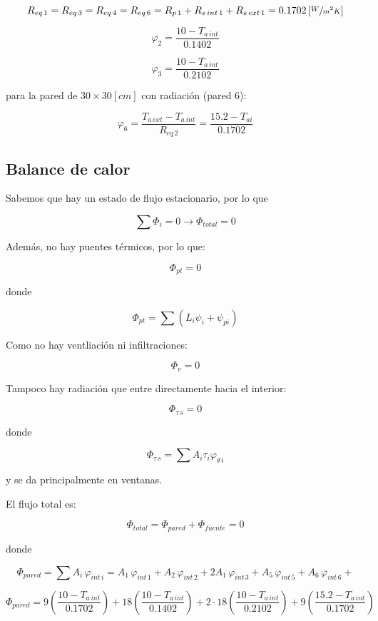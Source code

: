 \documentclass[12pt]{article}
\begin{document}
\[ R_{ eq \, 1 } = R_{ eq \, 3 } = R_{ eq \, 4 } = R_{ eq \, 6 } = R_{ p \, 1 } + R_{ s \, int \, 1 } + R_{ s \, ext \, 1 } = 0.1702 \left[ \sfrac{ W }{ m ^2 K } \right] \]

\[ \varphi _2 = \frac{ 10 - T_{ a \, int } }{ 0.1402 } \]

\[ \varphi _3 = \frac{ 10 - T_{ a \, int } }{ 0.2102 } \]

para la pared de $ 30 \times 30 \left[ cm \right] $ con radiación (pared 6):

\[ \varphi _6 = \frac{ T_{ a \, ext } - T_{ a \, int } }{ R_{ eq \, 2 } } = \frac{ 15.2 - T_{ ai } }{ 0.1702 } \]

\subsection{Balance de calor}

Sabemos que hay un estado de flujo estacionario, por lo que

\[  \sum{ \Phi _i } = 0 \longrightarrow \Phi _{ total } = 0 \]

Además, no hay puentes térmicos, por lo que:

\[ \Phi _{ pt } = 0 \]

donde

\[ \Phi _{ pt } = \sum{ \left( L_i \psi _i + \psi _{ pi } \right) }  \]

Como no hay ventliación ni infiltraciones:

\[ \Phi _v = 0 \]

Tampoco hay radiación que entre directamente hacia el interior:

\[ \Phi _{ \tau \, s } = 0 \]

donde

\[ \Phi _{ \tau \, s } = \sum{ A_i \tau _i \varphi _{ \theta \, i } } \]

y se da principalmente en ventanas.

El flujo total es:

\[ \Phi _{ total } = \Phi _{ pared } + \Phi _{ fuente } = 0 \]

donde

\[ \Phi _{ pared } = \sum{ A_i \, \varphi _{ int \, i } } = A_1 \, \varphi _{ int \, 1 } + A_2 \, \varphi _{ int \, 2 } + 2 A_1 \, \varphi _{ int \, 3 } + A_5 \, \varphi _{ int \, 5 } + A_6 \, \varphi _{ int \, 6 } + \]

\[ \Phi _{ pared } = 9 \left( \frac{ 10 - T_{ a \, int } }{ 0.1702 } \right) + 18 \left( \frac{ 10 - T_{ a \, int } }{ 0.1402 } \right) + 2 \cdot 18 \left( \frac{ 10 - T_{ a \, int } }{ 0.2102 } \right) + 9 \left( \frac{ 15.2 - T_{ a \, int } }{ 0.1702 } \right) \]
\end{document}
